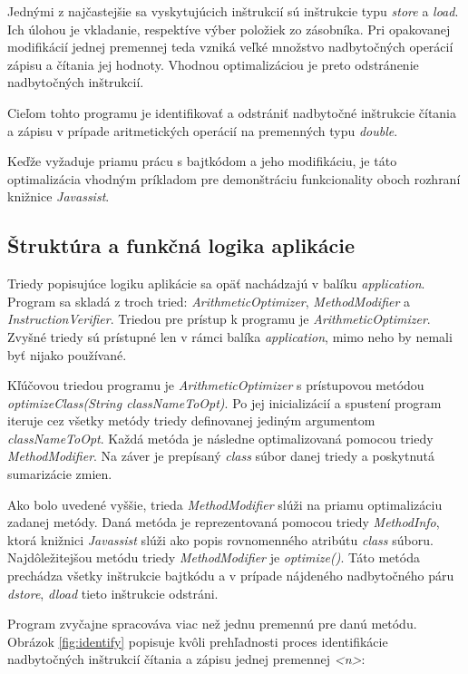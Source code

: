 \documentclass[11pt,final,oneside]{fithesis}
\begin{document}
Jednými z najčastejšie sa vyskytujúcich inštrukcií sú inštrukcie typu 
\textit{store} a \textit{load}. Ich úlohou je vkladanie, respektíve výber 
položiek zo zásobníka. Pri opakovanej modifikácií jednej premennej teda vzniká 
veľké množstvo nadbytočných operácií zápisu a čítania jej hodnoty. Vhodnou 
optimalizáciou je preto odstránenie nadbytočných inštrukcií.

Cieľom tohto programu je identifikovať a odstrániť nadbytočné inštrukcie 
čítania a zápisu v prípade aritmetických operácií na premenných typu 
\textit{double}. 

Keďže vyžaduje priamu prácu s bajtkódom a jeho modifikáciu, je táto 
optimalizácia vhodným príkladom pre demonštráciu funkcionality oboch rozhraní 
knižnice \textit{Javassist}.

\subsection{Štruktúra a funkčná logika aplikácie}
Triedy popisujúce logiku aplikácie sa opäť nachádzajú v balíku 
\textit{application}. Program sa skladá z troch tried: 
\textit{ArithmeticOptimizer}, \textit{MethodModifier} a 
\textit{InstructionVerifier}. Triedou pre prístup k programu je 
\textit{ArithmeticOptimizer}. Zvyšné triedy sú prístupné len v rámci balíka 
\textit{application}, mimo neho by nemali byť nijako používané.

Kľúčovou triedou programu je \textit{ArithmeticOptimizer} s prístupovou
metódou
\textit{optimizeClass(String classNameToOpt)}. Po jej inicializácií a spustení 
program iteruje cez všetky metódy triedy definovanej jediným argumentom 
\textit{classNameToOpt}. Každá metóda je následne optimalizovaná pomocou 
triedy \textit{MethodModifier}. Na záver je prepísaný \textit{class} súbor 
danej triedy a poskytnutá sumarizácie zmien.

Ako bolo uvedené vyššie, trieda \textit{MethodModifier} slúži na priamu 
optimalizáciu zadanej metódy. Daná metóda je reprezentovaná pomocou triedy 
\textit{MethodInfo}, ktorá knižnici \textit{Javassist} slúži ako popis 
rovnomenného atribútu \textit{class} súboru. Najdôležitejšou metódu triedy 
\textit{MethodModifier} je \textit{optimize()}. Táto metóda prechádza všetky 
inštrukcie bajtkódu a v prípade nájdeného nadbytočného páru \textit{dstore}, 
\textit{dload} tieto inštrukcie odstráni.

Program zvyčajne spracováva viac než jednu premennú pre danú metódu. Obrázok
\ref{fig:identify} popisuje kvôli prehľadnosti proces identifikácie
nadbytočných inštrukcií čítania a zápisu jednej premennej \textit{<n>}:
\end{document}

